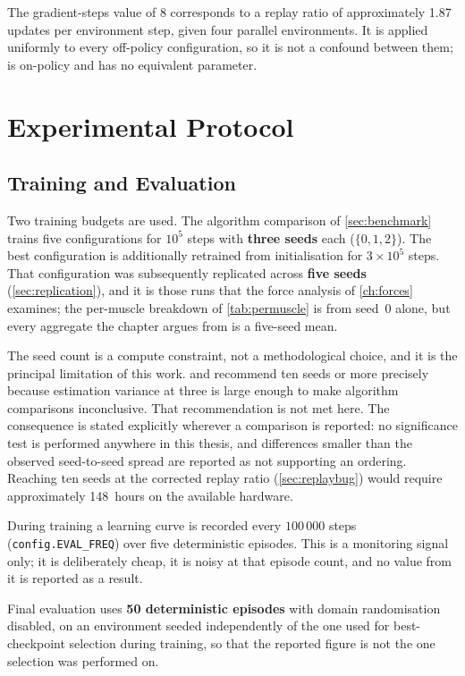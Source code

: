 The gradient-steps value of 8 corresponds to a replay ratio of approximately
1.87 updates per environment step, given four parallel environments. It is
applied uniformly to every off-policy configuration, so it is not a confound
between them; \PPO is on-policy and has no equivalent parameter.

\section{Experimental Protocol}

\subsection{Training and Evaluation}
\label{sec:compute}

Two training budgets are used. The algorithm comparison of
\cref{sec:benchmark} trains five configurations for $10^5$ steps with
\textbf{three seeds} each ($\{0,1,2\}$). The best configuration is additionally
retrained from initialisation for $3 \times 10^5$ steps. That configuration was
subsequently replicated across \textbf{five seeds} (\cref{sec:replication}), and
it is those runs that the force analysis of \cref{ch:forces} examines; the
per-muscle breakdown of \cref{tab:permuscle} is from seed~0 alone, but every
aggregate the chapter argues from is a five-seed mean.

The seed count is a compute constraint, not a methodological choice, and it is
the principal limitation of this work.
\textcite{Henderson2018} and \textcite{Agarwal2021} recommend ten seeds or more
precisely because estimation variance at three is large enough to make algorithm
comparisons inconclusive. That recommendation is not met here. The consequence is
stated explicitly wherever a comparison is reported: no significance test is
performed anywhere in this thesis, and differences smaller than the observed
seed-to-seed spread are reported as not supporting an ordering. Reaching ten
seeds at the corrected replay ratio (\cref{sec:replaybug}) would require
approximately 148~hours on the available hardware.

During training a learning curve is recorded every $100\,000$ steps
(\texttt{config.EVAL\_FREQ}) over five deterministic episodes. This is a monitoring signal only; it is
deliberately cheap, it is noisy at that episode count, and no value from it is
reported as a result.

Final evaluation uses \textbf{50 deterministic episodes} with domain
randomisation disabled, on an environment seeded independently of the one used
for best-checkpoint selection during training, so that the reported figure is not
the one selection was performed on.


